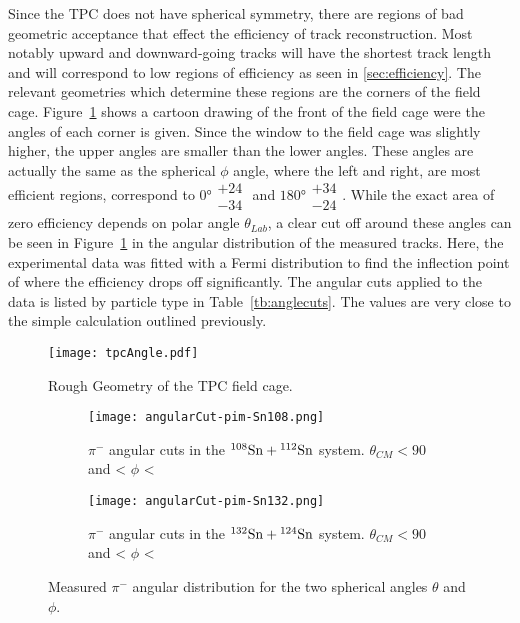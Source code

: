 Since the TPC does not have spherical symmetry, there are regions of bad geometric acceptance that effect the efficiency of track reconstruction. Most notably upward and downward-going tracks will have the shortest track length and will correspond to low regions of efficiency as seen in \ref{sec:efficiency}. The relevant geometries which determine these regions are the corners of the field cage. Figure~\ref{fig:angleEffExplanation} shows a cartoon drawing of the front of the field cage were the angles of each corner is given. Since the window to the field cage was slightly higher, the upper angles are smaller than the lower angles. These angles are actually the same as the spherical $\phi$ angle, where the left and right, are most efficient regions, correspond to  $\ang{0}\substack{+24 \\ -34}$ and $\ang{180}\substack{+34 \\ -24}$.  While the exact area of zero efficiency depends on polar angle $\theta_{Lab}$, a clear cut off around these angles can be seen in Figure~\ref{fig:angleEffExplanation} in the angular distribution of the measured tracks. Here, the experimental data was fitted with a Fermi distribution to find the inflection point of where the efficiency drops off significantly. The angular cuts applied to the data is listed by particle type in Table~\ref{tb:anglecuts}. The values are very close to the simple calculation outlined previously. 


\begin{figure}[!htb]
\centering
\texttt{[image: tpcAngle.pdf]}
\caption{Rough Geometry of the TPC field cage.}
\label{fig:angleEffExplanation}
\end{figure}


\begin{figure}[!htb]
     \centering
     \begin{subfigure}[b]{0.49\textwidth}
         \centering
         \texttt{[image: angularCut-pim-Sn108.png]}
         \caption{$\pi^-$ angular cuts in the ${}^{108}\mathrm{Sn} + {}^{112}\mathrm{Sn}$ system. $\theta_{CM} < 90$ and < $\phi$ <}
         \label{fig:pim108angle}
     \end{subfigure}
     \hfill
     \begin{subfigure}[b]{0.49\textwidth}
         \centering
         \texttt{[image: angularCut-pim-Sn132.png]}
         \caption{$\pi^-$ angular cuts in the ${}^{132}\mathrm{Sn} + {}^{124}\mathrm{Sn}$ system. $\theta_{CM} < 90$ and < $\phi$ <}
         \label{fig:pim132angle}
     \end{subfigure}
        \caption{Measured $\pi^-$ angular distribution for the two spherical angles $\theta$ and $\phi$.}
        \label{fig:pim}
\end{figure}


